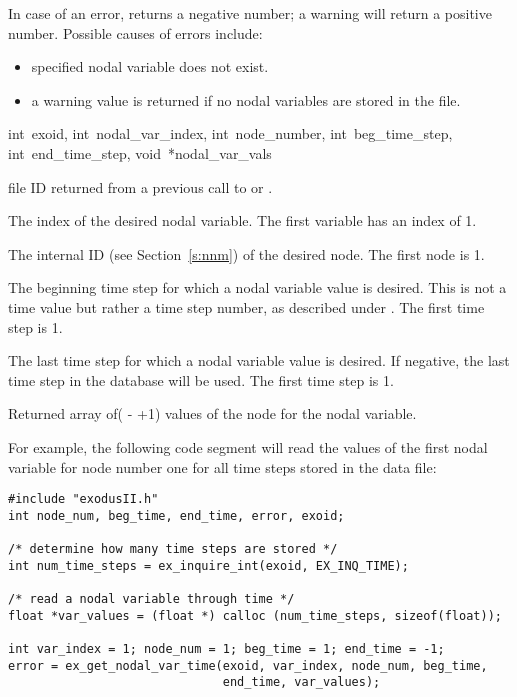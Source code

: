 In case of an error,  returns a
negative number; a warning will return a positive number. Possible
causes of errors include:

\begin{itemize}
 \item specified nodal variable does not exist.

 \item a warning value is returned if no nodal variables are stored in
 the file.
\end{itemize}

{int~exoid,
int~nodal_var_index,
int~node_number,
int~beg_time_step,
int~end_time_step,
void~*nodal_var_vals}

\begin{parameters}
\item[{int exoid \R{}}]
\exo{} file ID returned from a previous call to  or
.

\item[{int nodal_var_index \R{}}]
The index of the desired nodal variable. The first variable has an
index of 1.

\item[{int node_number \R{}}]
The internal ID (see  Section~\ref{s:nnm}) of the desired
node. The first node is 1.

\item[{int beg_time_step \R{}}]
The beginning time step for which a nodal variable value
is desired. This is not a time value but rather a time step number,
as described under . The first time step
is 1.

\item[{int end_time_step \R{}}]
The last time step for which a nodal variable value is desired. If
negative, the last time step in the database will be used. The first
time step is 1.

\item[{void* nodal_var_vals \W{}}]
Returned array of( {-}  +1) values
of the \th{} node for the \th{} nodal
variable.
\end{parameters}

For example, the following code segment will read the values
of the first nodal variable for node number one for all time
steps stored in the data file:
\begin{lstlisting}
#include "exodusII.h"
int node_num, beg_time, end_time, error, exoid;

/* determine how many time steps are stored */
int num_time_steps = ex_inquire_int(exoid, EX_INQ_TIME);

/* read a nodal variable through time */
float *var_values = (float *) calloc (num_time_steps, sizeof(float));

int var_index = 1; node_num = 1; beg_time = 1; end_time = -1;
error = ex_get_nodal_var_time(exoid, var_index, node_num, beg_time,
                              end_time, var_values);

\end{lstlisting}
